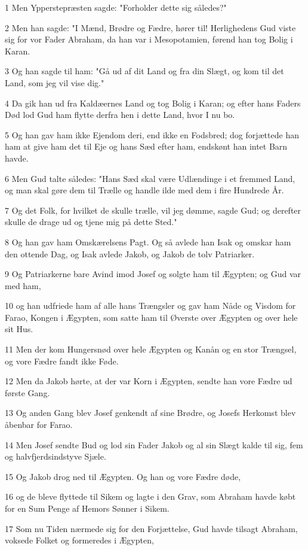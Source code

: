 \par 1 Men Ypperstepræsten sagde: "Forholder dette sig således?"
\par 2 Men han sagde: "I Mænd, Brødre og Fædre, hører til! Herlighedens Gud viste sig for vor Fader Abraham, da han var i Mesopotamien, førend han tog Bolig i Karan.
\par 3 Og han sagde til ham: "Gå ud af dit Land og fra din Slægt, og kom til det Land, som jeg vil vise dig."
\par 4 Da gik han ud fra Kaldæernes Land og tog Bolig i Karan; og efter hans Faders Død lod Gud ham flytte derfra hen i dette Land, hvor I nu bo.
\par 5 Og han gav ham ikke Ejendom deri, end ikke en Fodsbred; dog forjættede han ham at give ham det til Eje og hans Sæd efter ham, endskønt han intet Barn havde.
\par 6 Men Gud talte således: "Hans Sæd skal være Udlændinge i et fremmed Land, og man skal gøre dem til Trælle og handle ilde med dem i fire Hundrede År.
\par 7 Og det Folk, for hvilket de skulle trælle, vil jeg dømme, sagde Gud; og derefter skulle de drage ud og tjene mig på dette Sted."
\par 8 Og han gav ham Omskærelsens Pagt. Og så avlede han Isak og omskar ham den ottende Dag, og Isak avlede Jakob, og Jakob de tolv Patriarker.
\par 9 Og Patriarkerne bare Avind imod Josef og solgte ham til Ægypten; og Gud var med ham,
\par 10 og han udfriede ham af alle hans Trængsler og gav ham Nåde og Visdom for Farao, Kongen i Ægypten, som satte ham til Øverste over Ægypten og over hele sit Hus.
\par 11 Men der kom Hungersnød over hele Ægypten og Kanån og en stor Trængsel, og vore Fædre fandt ikke Føde.
\par 12 Men da Jakob hørte, at der var Korn i Ægypten, sendte han vore Fædre ud første Gang.
\par 13 Og anden Gang blev Josef genkendt af sine Brødre, og Josefs Herkomst blev åbenbar for Farao.
\par 14 Men Josef sendte Bud og lod sin Fader Jakob og al sin Slægt kalde til sig, fem og halvfjerdsindstyve Sjæle.
\par 15 Og Jakob drog ned til Ægypten. Og han og vore Fædre døde,
\par 16 og de bleve flyttede til Sikem og lagte i den Grav, som Abraham havde købt for en Sum Penge af Hemors Sønner i Sikem.
\par 17 Som nu Tiden nærmede sig for den Forjættelse, Gud havde tilsagt Abraham, voksede Folket og formeredes i Ægypten,
